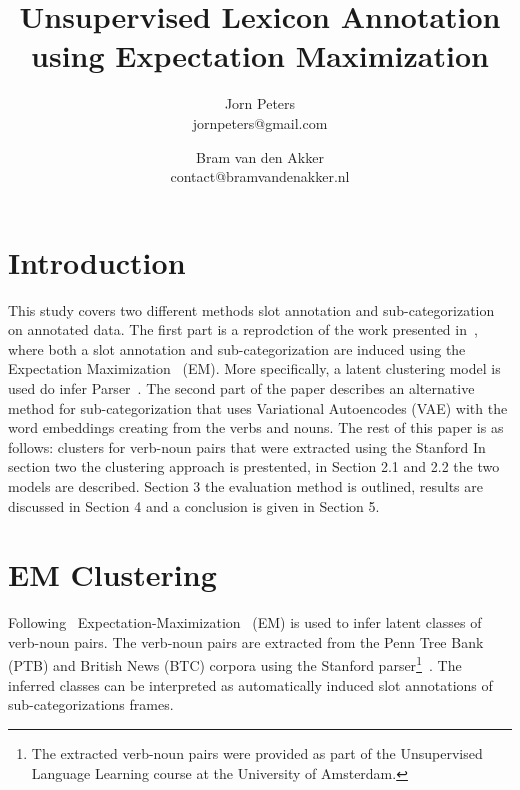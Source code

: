 \documentclass[11pt]{scrartcl}
\title{Unsupervised Lexicon Annotation using Expectation Maximization}
\author{Jorn Peters\\\small{jornpeters@gmail.com} \and Bram van den Akker\\\small{contact@bramvandenakker.nl}}
\begin{document}
\maketitle


\section{Introduction} %
This study covers two different methods slot annotation and
sub-categorization on annotated data. The first part is a reprodction of the work presented in~\cite{rooth1999inducing}, where both a slot annotation and
sub-categorization are induced using the
Expectation Maximization~\cite{dempster1977maximum} (EM). More specifically, a latent clustering model is used do infer
Parser~\cite{klein2003accurate}. The second part of the paper describes an alternative method for sub-categorization that uses Variational Autoencodes (VAE) with the word embeddings creating from the verbs and nouns. The rest of this paper is as follows:
clusters for verb-noun pairs that were extracted using the Stanford
In section two the clustering approach is prestented, in Section 2.1
and 2.2 the two models are described. Section 3 the evaluation method
is outlined, results are discussed in Section 4 and a conclusion is
given in Section 5. %

\section{EM Clustering} %
Following~\cite{rooth1999inducing}
Expectation-Maximization~\cite{dempster1977maximum} (EM) is used to
infer latent classes of verb-noun pairs. The verb-noun pairs are
extracted from the Penn Tree Bank (PTB) and British News (BTC) corpora
using the Stanford parser\footnote{The extracted verb-noun pairs were
provided as part of the Unsupervised Language Learning course at the
University of Amsterdam.}~\cite{klein2003accurate}.  The inferred
classes can be interpreted as automatically induced slot annotations
of sub-categorizations frames.
\end{document}
